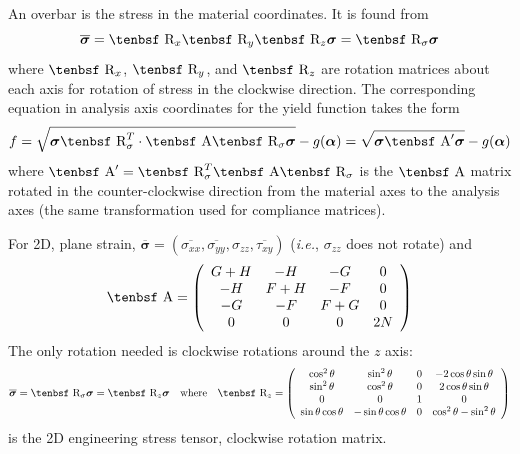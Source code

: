 \documentclass[11pt]{book}
\renewcommand{\vec}[1]{\boldsymbol{#1}}
\def\A{\hbox{\tenbsf A}}
\def\R{\hbox{\tenbsf R}}
\def\s#1{\sigma_{#1}}
\def\t#1{\tau_{#1}}
\begin{document}
An overbar is the stress in the material coordinates. It is found from
\begin{equation}
     \overline{\vec\sigma} = \R_x\R_y\R_z\vec\sigma = \R_\sigma\vec\sigma
\end{equation}
where $\R_x$, $\R_y$, and $\R_z$ are rotation matrices about each axis for rotation of stress in the clockwise direction.
The corresponding equation in analysis axis coordinates for the yield function takes the form
\begin{equation}
     f = \sqrt{\vec\sigma \R_\sigma^T\cdot \A \R_\sigma\vec\sigma} - g(\vec\alpha) = \sqrt{\vec\sigma \A' \vec\sigma} - g(\vec\alpha)     \label{fanaleq}
\end{equation}
where $\A' = \R_\sigma^T\A\R_\sigma$ is the $\A$ matrix rotated in the counter-clockwise direction from the material axes to the analysis axes (the same transformation used for compliance matrices).

For 2D, plane strain, $\overline{\vec\sigma} = (\overline{\s{xx}}, \overline{\s{yy}}, \s{zz}, \overline{\t{xy}})$ ({\em i.e.}, $\s{zz}$ does not rotate) and
\begin{equation}
      \A = \left( \begin{array}{cccc}
                       G+H & -H & -G & 0 \\
                       -H & F+H & -F & 0 \\
                       -G & -F & F+G & 0 \\
                       0 & 0 & 0 & 2N
                       \end{array} \right)
\end{equation}
The only rotation needed is clockwise rotations around the $z$ axis:
\begin{equation}
      \overline{\vec\sigma} = \R_\sigma\vec\sigma = \R_z\vec\sigma  \quad{\rm where}\quad \R_z = \left( \begin{array}{cccc}
                       \cos^2\theta & \sin^2\theta & 0 & -2\cos\theta\sin\theta \\
                       \sin^2\theta & \cos^2\theta & 0 & 2\cos\theta\sin\theta \\
                       0 & 0 & 1 & 0 \\
                       \sin\theta\cos\theta & -\sin\theta\cos\theta & 0 & \cos^2\theta - \sin^2\theta
                       \end{array} \right)
\end{equation}
is the 2D engineering stress tensor, clockwise rotation matrix.
\end{document}

